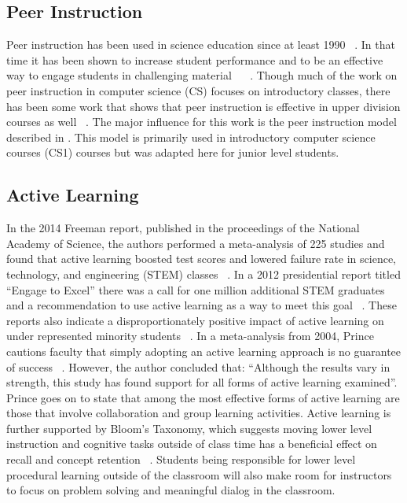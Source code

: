 \documentclass{article}
\begin{document}
\subsection{Peer Instruction}
Peer instruction has been used in science education since at least 1990 ~\cite{crouchPeerInstructionTen2001}. In that time it has been shown to increase student performance and to be an effective way to engage students in challenging material ~\cite{simonExperienceReportPeer2010a} ~\cite{porterMultiinstitutionalStudyPeer2016}. Though much of the work on peer instruction in computer science (CS) focuses on introductory classes, there has been some work that shows that peer instruction is effective in upper division courses as well ~\cite{leeCanPeerInstruction2013}.
The major influence for this work is the peer instruction model described in \cite{porterPeerInstructionStudents2011}. This model is primarily used in introductory computer science courses (CS1) courses but was adapted here for junior level students. 

\subsection{Active Learning}
In the 2014 Freeman report, published in the proceedings of the National Academy of Science, the authors performed a meta-analysis of 225 studies and found that active learning boosted test scores and lowered failure rate in science, technology, and engineering (STEM) classes ~\cite{freemanActiveLearningIncreases2014}. In a 2012 presidential report titled ``Engage to Excel'' there was a call for one million additional STEM graduates and a recommendation to use active learning as a way to meet this goal ~\cite{gatesEngageExcel2012}. These reports also indicate a disproportionately positive impact of active learning on under represented minority students ~\cite{freemanActiveLearningIncreases2014}.
In a meta-analysis from 2004, Prince cautions faculty that simply adopting an active learning approach is no guarantee of success ~\cite{princeDoesActiveLearning2004}. However, the author concluded that: ``Although the results vary in strength, this study has found support for all forms of active learning examined''. Prince goes on to state that among the most effective forms of active learning are those that involve collaboration and group learning activities.
Active learning is further supported by Bloom’s Taxonomy, which suggests moving lower level instruction and cognitive tasks outside of class time has a beneficial effect on recall and concept retention ~\cite{andersonTaxonomyLearningTeaching2014}. Students being responsible for lower level procedural learning outside of the classroom will also make room for instructors to focus on problem solving and meaningful dialog in the classroom.
\end{document}

